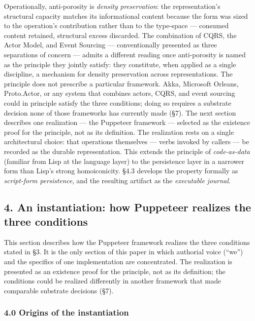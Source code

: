 \documentclass[
]{article}
\newcounter{none} %
\begin{document}
Operationally, anti-porosity is \emph{density preservation}: the
representation's structural capacity matches its informational content
because the form was sized to the operation's contribution rather than
to the type-space --- consumed content retained, structural excess
discarded. The combination of CQRS, the Actor Model, and Event Sourcing
--- conventionally presented as three separations of concern --- admits
a different reading once anti-porosity is named as the principle they
jointly satisfy: they constitute, when applied as a single discipline, a
mechanism for density preservation across representations. The principle
does not prescribe a particular framework. Akka, Microsoft Orleans,
Proto.Actor, or any system that combines actors, CQRS, and event
sourcing could in principle satisfy the three conditions; doing so
requires a substrate decision none of those frameworks has currently
made (§7). The next section describes one realization --- the Puppeteer
framework --- selected as the existence proof for the principle, not as
its definition. The realization rests on a single architectural choice:
that operations themselves --- verbs invoked by callers --- be recorded
as the durable representation. This extends the principle of
\emph{code-as-data} (familiar from Lisp at the language layer) to the
persistence layer in a narrower form than Lisp's strong homoiconicity.
§4.3 develops the property formally as \emph{script-form persistence},
and the resulting artifact as the \emph{executable journal}.

\subsection{4. An instantiation: how Puppeteer realizes the three
conditions}\label{an-instantiation-how-puppeteer-realizes-the-three-conditions}

This section describes how the Puppeteer framework realizes the three
conditions stated in §3. It is the only section of this paper in which
authorial voice (``we'') and the specifics of one implementation are
concentrated. The realization is presented as an existence proof for the
principle, not as its definition; the conditions could be realized
differently in another framework that made comparable substrate
decisions (§7).

\subsubsection{4.0 Origins of the
instantiation}\label{origins-of-the-instantiation}
\end{document}
